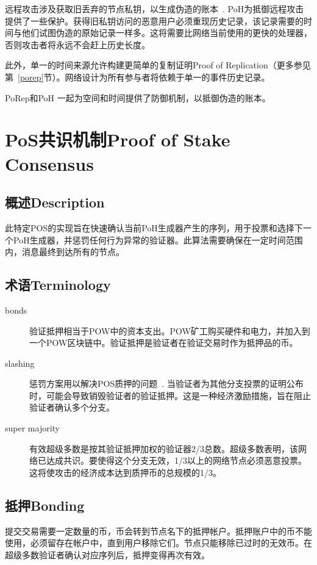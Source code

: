 \documentclass[12pt, uft8]{ctexart}
\begin{document}
远程攻击涉及获取旧丢弃的节点私钥，以生成伪造的账本~\cite{casper}. PoH为抵御远程攻击提供了一些保护。获得旧私钥访问的恶意用户必须重现历史记录，该记录需要的时间与他们试图伪造的原始记录一样多。这将需要比网络当前使用的更快的处理器，否则攻击者将永远不会赶上历史长度。  

此外，单一的时间来源允许构建更简单的复制证明Proof of Replication（更多参见第~\ref{porep}节）。网络设计为所有参与者将依赖于单一的事件历史记录。

PoRep和PoH 一起为空间和时间提供了防御机制，以抵御伪造的账本。


\section{PoS共识机制Proof of Stake Consensus}\label{proof_of_stake}
\subsection{概述Description}
此特定POS的实现旨在快速确认当前PoH生成器产生的序列，用于投票和选择下一个PoH生成器，并惩罚任何行为异常的验证器。此算法需要确保在一定时间范围内，消息最终到达所有的节点。
\subsection{术语Terminology}
\begin{description}

\item[bonds]
验证抵押相当于POW中的资本支出。POW矿工购买硬件和电力，并加入到一个POW区块链中。验证抵押是验证者在验证交易时作为抵押品的币。

\item[slashing]

惩罚方案用以解决POS质押的问题~\cite{slasher}. 当验证者为其他分支投票的证明公布时，可能会导致销毁验证者的验证抵押。这是一种经济激励措施，旨在阻止验证者确认多个分支。
\item[super majority]
有效超级多数是按其验证抵押加权的验证器2/3总数。超级多数表明，该网络已达成共识。要使得这个分支无效，1/3以上的网络节点必须恶意投票。这将使攻击的经济成本达到质押币的总规模的1/3。   

\end{description}

\subsection{抵押Bonding}
提交交易需要一定数量的币，币会转到节点名下的抵押帐户。抵押账户中的币不能使用，必须留存在帐户中，直到用户移除它们。节点只能移除已过时的无效币。在超级多数验证者确认对应序列后，抵押变得再次有效。
\end{document}

